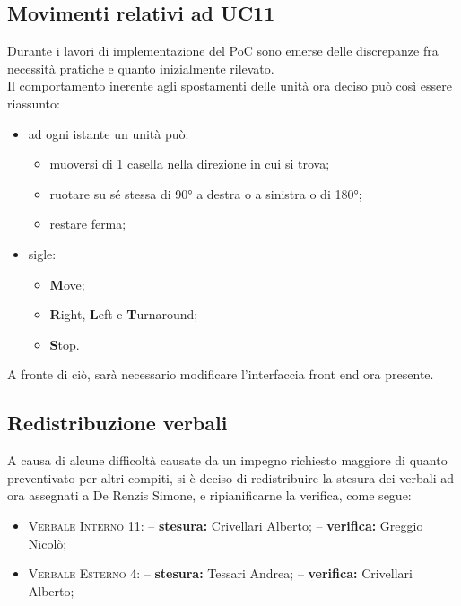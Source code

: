 \subsection{Movimenti relativi ad UC11}
\label{moves}
    Durante i lavori di implementazione del PoC sono emerse delle discrepanze fra necessità pratiche e quanto inizialmente rilevato. \\Il comportamento inerente agli spostamenti delle unità ora deciso può così essere riassunto:
    \begin{itemize}
        \item ad ogni istante un unità può:
        \begin{itemize}
            \item muoversi di 1 casella nella direzione in cui si trova;
            \item ruotare su sé stessa di 90° a destra o a sinistra o di 180°;
            \item restare ferma;
        \end{itemize}
        \item sigle:
        \begin{itemize}
            \item \textbf{M}ove;
            \item \textbf{R}ight, \textbf{L}eft e \textbf{T}urnaround;
            \item \textbf{S}top.
        \end{itemize}
    \end{itemize}
    A fronte di ciò, sarà necessario modificare l'interfaccia front end ora presente.

\subsection{Redistribuzione verbali}
    A causa di alcune difficoltà causate da un impegno richiesto maggiore di quanto preventivato per altri compiti, si è deciso di redistribuire la stesura dei verbali ad ora assegnati a De Renzis Simone, e ripianificarne la verifica, come segue:
    \begin{itemize}
        \item \textsc{Verbale Interno 11}:
            \subitem -- \textbf{stesura: }Crivellari Alberto;
            \subitem -- \textbf{verifica: }Greggio Nicolò;
        \item \textsc{Verbale Esterno 4}:
            \subitem -- \textbf{stesura: }Tessari Andrea;
            \subitem -- \textbf{verifica: }Crivellari Alberto;
    \end{itemize}

